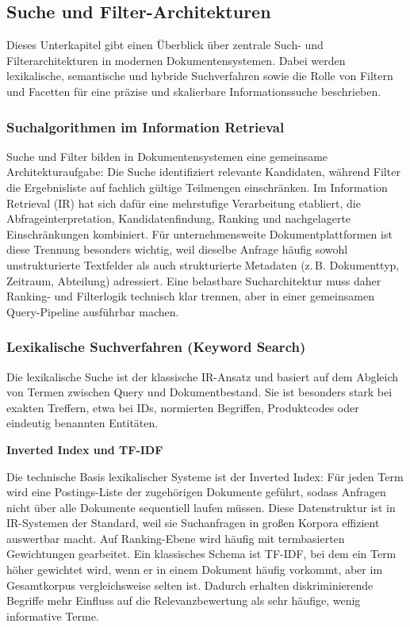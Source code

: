 \subsection{Suche und Filter-Architekturen}

Dieses Unterkapitel gibt einen Überblick über zentrale Such- und
Filterarchitekturen in modernen Dokumentensystemen. Dabei werden lexikalische,
semantische und hybride Suchverfahren sowie die Rolle von Filtern und Facetten
für eine präzise und skalierbare Informationssuche beschrieben.

\subsubsection{Suchalgorithmen im Information Retrieval}

Suche und Filter bilden in Dokumentensystemen eine gemeinsame Architekturaufgabe:
Die Suche identifiziert relevante Kandidaten, während Filter die Ergebnisliste auf
fachlich gültige Teilmengen einschränken.
Im Information Retrieval (IR) hat sich dafür eine mehrstufige Verarbeitung
etabliert, die Abfrageinterpretation, Kandidatenfindung, Ranking und nachgelagerte
Einschränkungen kombiniert. Für unternehmensweite Dokumentplattformen ist diese Trennung besonders wichtig,
weil dieselbe Anfrage häufig sowohl unstrukturierte Textfelder als auch strukturierte
Metadaten (z.\,B. Dokumenttyp, Zeitraum, Abteilung) adressiert.
Eine belastbare Sucharchitektur muss daher Ranking- und Filterlogik technisch klar
trennen, aber in einer gemeinsamen Query-Pipeline ausführbar machen.
\cite{elastic_query_filter_context,manning2008irbook}
 

\subsubsection{Lexikalische Suchverfahren (Keyword Search)}

Die lexikalische Suche ist der klassische IR-Ansatz und basiert auf dem Abgleich
von Termen zwischen Query und Dokumentbestand.
Sie ist besonders stark bei exakten Treffern, etwa bei IDs, normierten Begriffen,
Produktcodes oder eindeutig benannten Entitäten. \cite{manning2008irbook}

\textbf{Inverted Index und TF-IDF}

Die technische Basis lexikalischer Systeme ist der Inverted Index: Für jeden Term
wird eine Postings-Liste der zugehörigen Dokumente geführt, sodass Anfragen nicht
über alle Dokumente sequentiell laufen müssen.
Diese Datenstruktur ist in IR-Systemen der Standard, weil sie Suchanfragen in großen
Korpora effizient auswertbar macht. Auf Ranking-Ebene wird häufig mit termbasierten Gewichtungen gearbeitet. Ein
klassisches Schema ist TF-IDF, bei dem ein Term höher gewichtet wird, wenn er in
einem Dokument häufig vorkommt, aber im Gesamtkorpus vergleichsweise selten ist.
Dadurch erhalten diskriminierende Begriffe mehr Einfluss auf die Relevanzbewertung
als sehr häufige, wenig informative Terme. \cite{stanford_tfidf,manning2008irbook}


